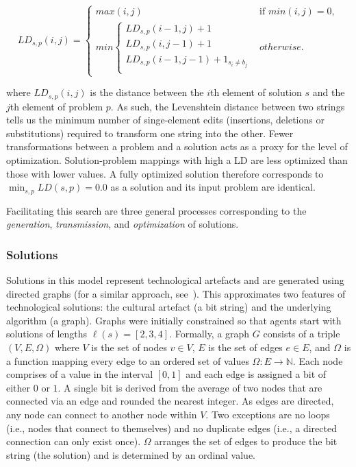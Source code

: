 \documentclass{article}
\begin{document}
\begin{equation} 
LD_{s,p} (i,j) =
\begin{cases}
    max(i,j) & \text{if $min(i,j)=0$}, \\
    min \begin{cases}
    LD_{s,p}(i - 1,j) + 1 \\
    LD_{s,p}(i, j - 1) + 1 \\
    LD_{s,p}(i - 1,j - 1) + 1_{s_i \neq b_j} \\
    \end{cases}
    & otherwise.
\end{cases}
\end{equation}

where $LD_{s,p} (i,j)$ is the distance between the $i$th element of solution $s$ and the $j$th element of problem $p$. As such, the Levenshtein distance between two strings tells us the minimum number of singe-element edits (insertions, deletions or substitutions) required to transform one string into the other. Fewer transformations between a problem and a solution acts as a proxy for the level of optimization. Solution-problem mappings with high a LD are less optimized than those with lower values. A fully optimized solution therefore corresponds to $\min_{s,p} LD(s,p)=0.0$ as a solution and its input problem are identical. 

Facilitating this search are three general processes corresponding to the {\em generation}, {\em transmission}, and {\em optimization} of solutions.

\subsubsection{Solutions}
Solutions in this model represent technological artefacts and are generated using directed graphs (for a similar approach, see~\cite{enquist2011modelling}). This approximates two features of technological solutions: the cultural artefact (a bit string) and the underlying algorithm (a graph). Graphs were initially constrained so that agents start with solutions of lengths $\ell(s)=[2,3,4]$. Formally, a graph $G$ consists of a triple $(V,E,\Omega)$ where $V$ is the set of nodes $v \in V$, $E$ is the set of edges $e \in E$, and $\Omega$ is a function mapping every edge to an ordered set of values $\Omega: E \to \mathbb{N}$. Each node comprises of a value in the interval $[0,1]$ and each edge is assigned a bit of either $0$ or $1$. A single bit is derived from the average of two nodes that are connected via an edge and rounded the nearest integer. As edges are directed, any node can connect to another node within $V$. Two exceptions are no loops (i.e., nodes that connect to themselves) and no duplicate edges (i.e., a directed connection can only exist once). $\Omega$ arranges the set of edges to produce the bit string (the solution) and is determined by an ordinal value.
\end{document}
